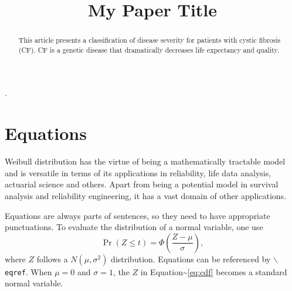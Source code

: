 \documentclass[letterpaper,inpress]{jdsart}
\begin{document}
\begin{frontmatter}

\title{My Paper Title}

\author[1,2]{
      }
\author[2]{
    }
\author[3]{
  }
\author[3]{
  }

\address[1]{Department A, 
  , }
\address[2]{
  , }
\address[3]{
  , }

\begin{abstract}
This article presents a classification of disease severity for patients with cystic fibrosis (CF). CF is a genetic disease that dramatically decreases life expectancy and quality.
\end{abstract}

\begin{keywords}
.
\end{keywords}

\end{frontmatter}

\hypertarget{equations}{%
\section{Equations}\label{equations}}

Weibull distribution has the virtue of being a mathematically tractable model
and is versatile in terms of its applications in reliability, life data
analysis, actuarial science and others. Apart from being a potential model in
survival analysis and reliability engineering, it has a vast domain of other
applications.

Equations are always parts of sentences, so they need to have
appropriate punctuations. To evaluate the distribution of a normal
variable, one use
\begin{equation}
  \label{eq:cdf}
  \Pr(Z \le t) = \Phi\left(\frac{Z - \mu}{\sigma} \right),
\end{equation}
where \(Z\) follows a \(N(\mu, \sigma^2)\) distribution.
Equations can be referenced by \texttt{$\backslash$eqref}.
When \(\mu = 0\) and \(\sigma = 1\), the \(Z\) in Equation\textasciitilde{}\eqref{eq:cdf}
becomes a standard normal variable.
\end{document}
